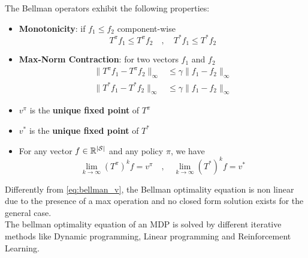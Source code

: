 The Bellman operators exhibit the following properties:
\begin{itemize}
    \item \textbf{Monotonicity}: if $f_1 \le f_2$ component-wise \\
    \[T^\pi f_1 \le T^\pi f_2 \quad,\quad T^*f_1 \le T^*f_2\]
    \item \textbf{Max-Norm Contraction}: for two vectors $f_1$ and $f_2$ \\
    \begin{align*}
    \lVert T^\pi f_1 - T^\pi f_2 \rVert _\infty &\le \gamma \lVert f_1 - f_2 \rVert _\infty \\
    \lVert T^* f_1 - T^* f_2 \rVert _\infty &\le \gamma \lVert f_1 - f_2 \rVert _\infty
    \end{align*}
    \item $v^\pi$ is the \textbf{unique fixed point} of $T^\pi$
    \item $v^*$ is the \textbf{unique fixed point} of $T^*$
    \item For any vector $f \in \mathbb{R}^{|\mathcal{S}|}$ and any policy $\pi$, we have \\
    \[\lim_{k \to \infty}(T^\pi)^kf = v^\pi \quad,\quad \lim_{k \to \infty}(T^*)^kf = v^*\]
    
\end{itemize}

Differently from \eqref{eq:bellman_v}, the Bellman optimality equation is non linear due to the presence of a max operation
and no closed form solution exists for the general case.
\\
The bellman optimality equation of an MDP is solved by different iterative methods like Dynamic programming, Linear programming and Reinforcement Learning.

